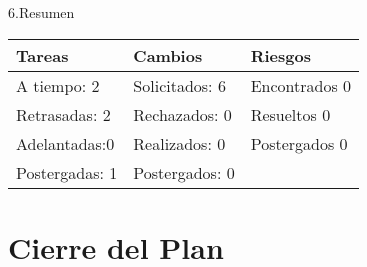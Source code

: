 \documentclass[12pt]{report}
\numberwithin{equation}{section}
\begin{document}
\begin{flushleft}
\large{6.Resumen}\\

\begin{table}[H]
\begin{tabular}{|m{5cm}|m{5cm}|m{5cm}|}
\hline
\textbf{Tareas} & \textbf{Cambios} & \textbf{Riesgos}\\
\hline \hline 
A tiempo: 2 & Solicitados: 6 & Encontrados 0 \\
\hline
Retrasadas: 2 & Rechazados: 0 & Resueltos 0 \\
\hline
Adelantadas:0  & Realizados: 0  & Postergados 0 \\
\hline
Postergadas: 1 & Postergados:  0 & \\
\hline
\end{tabular}
\label{tabla: TABLA CE Resumen}
\end{table}

\end{flushleft}

\newpage

\centering \section{Cierre del Plan}\label{CE Cierre}
\end{document}
